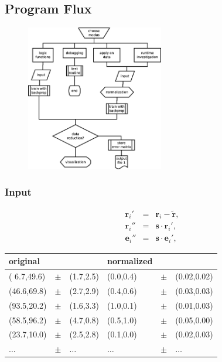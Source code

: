 \documentclass{beamer}
\begin{document}
\subsection{Program Flux}
\begin{frame}
  \begin{figure}
    \centering
    \includegraphics[width=6cm]{fig/dia.eps}
  \end{figure}

\end{frame}

\begin{frame}
  \frametitle{Input}
  \begin{eqnarray*}
    \mathbf{r}_i' &=& \mathbf{r}_i-\tilde{\mathbf{r}},\\
    \mathbf{r}_i''&=& \mathbf{s}\cdot\mathbf{r}_i',\\
    \mathbf{e}_i''&=& \mathbf{s}\cdot\mathbf{e}_i',
  \end{eqnarray*}
  \begin{table}
    \begin{center}
      \begin{tabular}{|lcl|lcl|}\hline
        original&&&normalized&&\\
        \hline\hline
        ( 6.7,49.6)&$\pm$&(1.7,2.5) & (0.0,0.4)&$\pm$&(0.02,0.02)\\
        (46.6,69.8)&$\pm$&(2.7,2.9) & (0.4,0.6)&$\pm$&(0.03,0.03)\\
        (93.5,20.2)&$\pm$&(1.6,3.3) & (1.0,0.1)&$\pm$&(0.01,0.03)\\
        (58.5,96.2)&$\pm$&(4.7,0.8) & (0.5,1.0)&$\pm$&(0.05,0.00)\\
        (23.7,10.0)&$\pm$&(2.5,2.8) & (0.1,0.0)&$\pm$&(0.02,0.03)\\
        $\ldots$   &$\pm$&$\ldots$  & $\ldots$ &$\pm$&$\ldots$\\
        \hline
      \end{tabular}
    \end{center}
  \end{table}
\end{frame}
\end{document}
